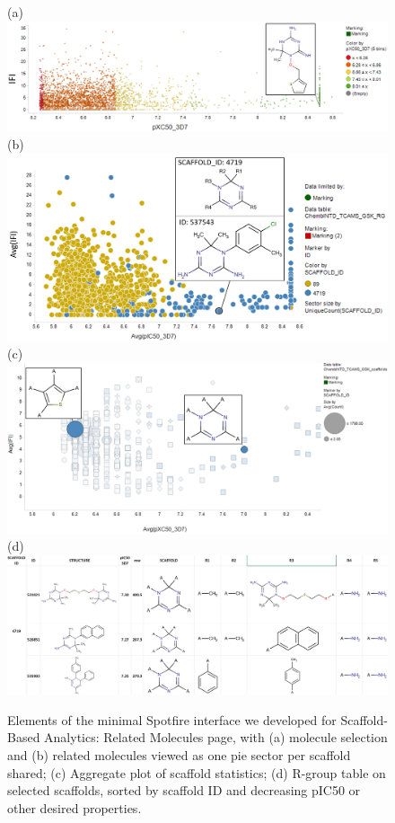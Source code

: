 \documentclass[journal=jacsat,biochem,manuscript=article]{achemso}
\begin{document}
\begin{figure}
(a)\includegraphics[width=5in]{fig/Fig4a_top_struc.png}\\
(b)\includegraphics[width=5in]{fig/Fig4b_scafpie_struc.png}\\
(c)\includegraphics[width=5in]{fig/Fig4c_scafaggr_struc.png}\\
(d)\includegraphics[width=5in]{fig/Fig4d_RGtable_struc.png}

\caption{Elements of the minimal Spotfire interface we developed for Scaffold-Based Analytics: Related Molecules page, with (a) molecule selection and (b) related molecules viewed as one pie sector per scaffold shared; (c) Aggregate plot of scaffold statistics;  (d) R-group table on selected scaffolds, sorted by scaffold ID and decreasing pIC50 or other desired properties.}
 \label{fig:spotviz}
\end{figure}
\end{document}
